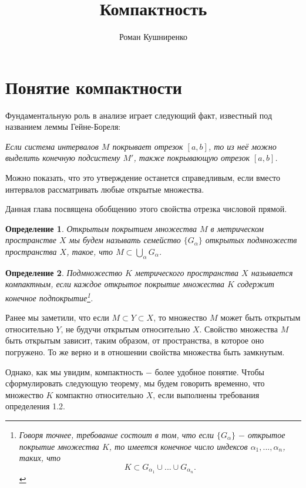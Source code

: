 \documentclass{article}
\title{Компактность}
\author{Роман Кушниренко}
\newtheorem{definition}{Определение}[section]
\begin{document}

	\maketitle

	\section{Понятие компактности}

Фундаментальную роль в анализе играет следующий факт, известный под названием леммы Гейне-Бореля:

\textit{Если система интервалов \(M\) покрывает отрезок \([a, b]\), то из неё можно выделить конечную подсистему \(M'\), также покрывающую отрезок \([a, b]\).}

Можно показать, что это утверждение останется справедливым, если вместо интервалов рассматривать любые открытые множества.

Данная глава посвящена обобщению этого свойства отрезка числовой прямой.

\begin{definition}
Открытым покрытием множества \(M\) в метрическом пространстве \(X\) мы будем называть семейство \(\{G_\alpha\}\) открытых подмножеств пространства \(X\), такое, что \(M \subset \bigcup\limits_{\alpha}G_\alpha\).
\end{definition}

\begin{definition}
Подмножество \(K\) метрического пространства \(X\) называется компактным, если каждое открытое покрытие множества \(K\) содержит конечное подпокрытие\footnote[1]
{
Говоря точнее, требование состоит в том, что если \(\{G_\alpha\}\) \(-\) открытое покрытие множества \(K\), то имеется конечное число индексов \(\alpha_1, ..., \alpha_n\), таких, что
\[
K \subset G_{\alpha_1} \cup ... \cup G_{\alpha_n}.
\]
}. \newline
\end{definition}

Ранее мы заметили, что если \(M \subset Y \subset X\), то множество \(M\) может быть открытым относительно \(Y\), не будучи открытым относительно \(X\). Свойство множества \(M\) быть открытым зависит, таким образом, от пространства, в которое оно погружено. То же верно и в отношении свойства множества быть замкнутым.

Однако, как мы увидим, компактность \(-\) более удобное понятие. Чтобы сформулировать следующую теорему, мы будем говорить временно, что множество \(K\) компактно относительно \(X\), если выполнены требования определения 1.2.
\end{document}
